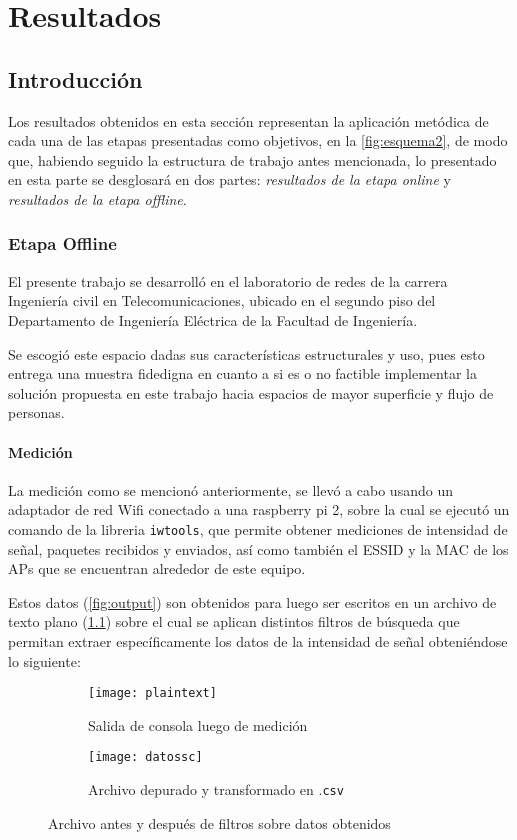 \chapter{Resultados}

\section{Introducción}
Los resultados obtenidos en esta sección representan la aplicación metódica de cada una de las etapas presentadas como objetivos, en la \ref{fig:esquema2}, de modo que, habiendo seguido la estructura de trabajo antes mencionada, lo presentado en esta parte se desglosará en dos partes: \textit{resultados de la etapa online} y \textit{resultados de la etapa offline}.

\subsection{Etapa Offline}
El presente trabajo se desarrolló en el laboratorio de redes de la carrera Ingeniería civil en Telecomunicaciones, ubicado en el segundo piso del Departamento de Ingeniería Eléctrica de la Facultad de Ingeniería.

Se escogió este espacio dadas sus características estructurales y uso, pues esto entrega una muestra fidedigna en cuanto a si es o no factible implementar la solución propuesta en este trabajo hacia espacios de mayor superficie y flujo de personas.

\subsubsection{Medición}
La medición como se mencionó anteriormente, se llevó a cabo usando un adaptador de red Wifi conectado a una raspberry pi 2, sobre la cual se ejecutó un comando de la libreria \texttt{iwtools}, que permite obtener mediciones de intensidad de señal, paquetes recibidos y enviados, así como también el ESSID y la MAC de los APs que se encuentran alrededor  de este equipo.

Estos datos (\ref{fig:output}) son obtenidos para luego ser escritos en un archivo de texto plano (\ref{fig:plaintext}) sobre el cual se aplican distintos filtros de búsqueda que permitan extraer específicamente los datos de la intensidad de señal obteniéndose lo siguiente:

\begin{figure}[h!]
\begin{subfigure}{.345\textwidth}
  \centering
  \texttt{[image: plaintext]}  
  \caption{Salida de consola luego de medición}
  \label{fig:plaintext}
\end{subfigure}
\begin{subfigure}{.65\textwidth}
  \centering
  \texttt{[image: datossc]}  
  \caption{Archivo depurado y transformado en .\texttt{csv}}
  \label{fig:plaincsv}
\end{subfigure}
\caption{Archivo antes y después de filtros sobre datos obtenidos}
\label{fig:tratdatos}
\end{figure}

